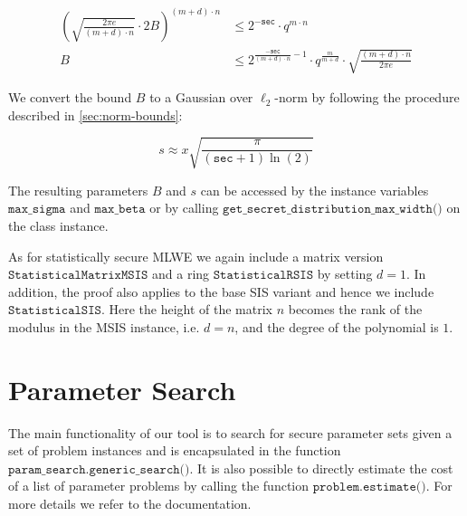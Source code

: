 
\begin{align}
    \left(\sqrt{\frac{2 \pi e}{(m+d) \cdot n}} \cdot 2 B\right)^{(m+d) \cdot n} & \leq 2^{-\texttt{sec}} \cdot q^{m\cdot n}                                                                       \\
    B                                                                           & \leq 2^{\frac{-\texttt{sec}}{(m+d)\cdot n} - 1} \cdot q^\frac{m}{m+d} \cdot \sqrt{\frac{(m+d)\cdot n}{2 \pi e}}
\end{align}

We convert the bound $B$ to a Gaussian over $\ell_2$-norm by following the procedure described in \cref{sec:norm-bounds}: %

\begin{equation}
    s  \approx x \sqrt{\frac{\pi}{(\texttt{sec} + 1) \ln(2)}}
\end{equation}

The resulting parameters $B$ and $s$ can be accessed by the instance variables $\texttt{max\_sigma}$ and $\texttt{max\_beta}$ or by calling $\texttt{get\_secret\_distribution\_max\_width()}$ on the class instance.

As for statistically secure MLWE we again include a matrix version $\texttt{StatisticalMatrixMSIS}$ and a ring $\texttt{StatisticalRSIS}$ by setting $d=1$. In addition, the proof also applies to the base SIS variant and hence we include $\texttt{StatisticalSIS}$. Here the height of the matrix $n$ becomes the rank of the modulus in the MSIS instance, i.e. $d=n$, and the degree of the polynomial is $1$.




\section{Parameter Search}
The main functionality of our tool is to search for secure parameter sets given a set of problem instances and is encapsulated in the function $\texttt{param\_search.generic\_search()}$. It is also possible to directly estimate the cost of a list of parameter problems by calling the function $\texttt{problem.estimate()}$. For more details we refer to the documentation.

